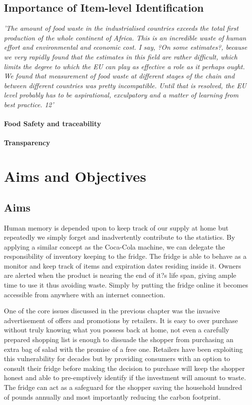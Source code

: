 \documentclass[a4paper, 11pt]{article}
\begin{document}
\subsection{Importance of Item-level Identification}
\emph{'The amount of food waste in the industrialised countries exceeds the total first
production of the whole continent of Africa. This is an incredible waste of human effort
and environmental and economic cost. I say, ?On some estimates?, because we very
rapidly found that the estimates in this field are rather difficult, which limits the degree
to which the EU can play as effective a role as it perhaps ought. We found that
measurement of food waste at different stages of the chain and between different
countries was pretty incompatible. Until that is resolved, the EU level probably has to
be aspirational, exculpatory and a matter of learning from best practice. 12'}
\paragraph{Food Safety and traceability}
\paragraph{Transparency}

\clearpage
\section{Aims and Objectives}
\subsection{Aims}
Human memory is depended upon to keep track of our supply at home but repeatedly we simply forget and inadvertently contribute to the statistics. By applying a similar concept as the Coca-Cola machine, we can delegate the responsibility of inventory keeping to the fridge. The fridge is able to behave as a monitor and keep track of items and expiration dates residing inside it. Owners are alerted when the product is nearing the end of it?s life span, giving ample time to use it thus avoiding waste. Simply by putting the fridge online it becomes accessible from anywhere with an internet connection.

One of the core issues discussed in the previous chapter was the invasive advertisement of offers and promotions by retailers. It is easy to over purchase without truly knowing what you possess back at home, not even a carefully prepared shopping list is enough to dissuade the shopper from purchasing an extra bag of salad with the promise of a free one. Retailers have been exploiting this vulnerability for decades but by providing consumers with an option to consult their fridge before making the decision to purchase will keep the shopper honest and able to pre-emptively identify if the investment will amount to waste. The fridge can act as a safeguard for the shopper saving the household hundred of pounds annually and most importantly reducing the carbon footprint. 
\end{document}
